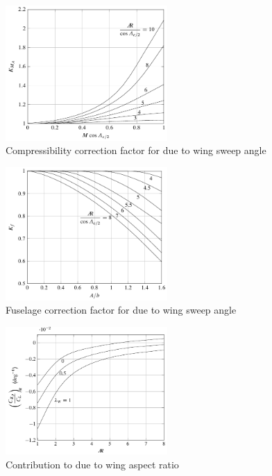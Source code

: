 \begin{figure}[htbp]
\centering
\includegraphics[width=0.55\textwidth]{Immagini/Capitolo2/4_40-K_M_Lam}
\caption[Compressibility correction factor for \CLbetaWB due to $\Lambda_{c/2}$] {Compressibility correction factor for \CLbetaWB due to wing sweep angle}
\label{compressibilitycorrection}
\end{figure}

\begin{figure}[htbp]
\centering
\includegraphics[width=0.55\textwidth]{Immagini/Capitolo2/4_41-K_Roll_f}
\caption[Fuselage correction factor for \CLbetaWB due to $\Lambda_{c/2}$] {Fuselage correction factor for \CLbetaWB due to wing sweep angle}
\label{fuselagecorrection}
\end{figure}

\begin{figure}[htbp]
\centering
\includegraphics[width=0.55\textwidth]{Immagini/Capitolo2/4_42-K_Roll_AR}
\caption[Correction for \CLbetaWB due to \ARW] {Contribution to \CLbetaWB due to wing aspect ratio}
\label{wingaspectratiocorrection}
\end{figure}

